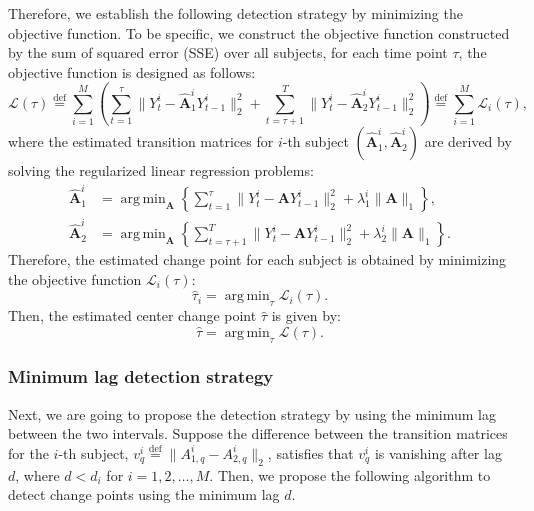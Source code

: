 \documentclass[11pt]{article}
\DeclareMathOperator*{\argmin}{arg\,min}
\begin{document}
Therefore, we establish the following detection strategy by minimizing the objective function. To be specific, we construct the objective function constructed by the sum of squared error (SSE) over all subjects, for each time point $\tau$, the objective function is designed as follows:
\begin{equation}
    \label{eq:3}
    \mathcal{L}(\tau) \overset{\text{def}}{=} \sum_{i=1}^M\left(\sum_{t=1}^\tau\|Y_t^i - \widehat{\mathbf{A}}_1^iY_{t-1}^i\|_2^2 + \sum_{t=\tau+1}^T \|Y_t^i - \widehat{\mathbf{A}}_2^iY_{t-1}^i\|_2^2 \right) \overset{\text{def}}{=} \sum_{i=1}^M \mathcal{L}_i(\tau),
\end{equation}
where the estimated transition matrices for $i$-th subject $(\widehat{\mathbf{A}}_1^i, \widehat{\mathbf{A}}_2^i)$ are derived by solving the regularized linear regression problems:
\begin{equation}
    \label{eq:4}
    \begin{aligned}
        \widehat{\mathbf{A}}_1^i &= \argmin_{\mathbf{A}} \left\{ \sum_{t=1}^{\tau}\|Y_t^i - \mathbf{A}Y_{t-1}^i\|_2^2 + \lambda_1^i\|\mathbf{A}\|_1 \right\}, \\
        \widehat{\mathbf{A}}_2^i &= \argmin_{\mathbf{A}} \left\{ \sum_{t=\tau+1}^T\|Y_t^i - \mathbf{A}Y_{t-1}^i\|_2^2 + \lambda_2^i\|\mathbf{A}\|_1 \right\}.
    \end{aligned}
\end{equation}
Therefore, the estimated change point for each subject is obtained by minimizing the objective function $\mathcal{L}_i(\tau)$:
\begin{equation*}
    \widehat{\tau}_i = \argmin_\tau \mathcal{L}_i(\tau).
\end{equation*}
Then, the estimated center change point $\widehat{\tau}$ is given by:
\begin{equation}
    \label{eq:5}
    \widehat{\tau} = \argmin_\tau \mathcal{L}(\tau).
\end{equation}

\subsubsection{Minimum lag detection strategy}
Next, we are going to propose the detection strategy by using the minimum lag between the two intervals. Suppose the difference between the transition matrices for the $i$-th subject, $v_q^i \overset{\text{def}}{=} \|A^i_{1,q} - A^i_{2,q}\|_2$, satisfies that $v_q^i$ is vanishing after lag $d$, where $d < d_i$ for $i=1,2,\dots, M$. Then, we propose the following algorithm to detect change points using the minimum lag $d$. 
\end{document}
